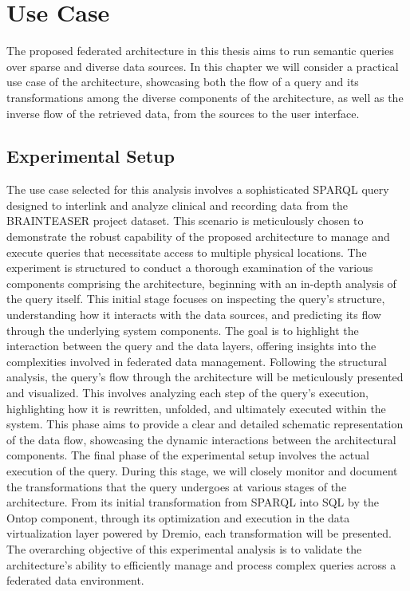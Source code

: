 
\chapter{Use Case}
\label{chp:usecase}

The proposed federated architecture in this thesis aims to run semantic queries over sparse and diverse data sources. In this chapter we will consider a practical use case of the architecture, showcasing both the flow of a query and its transformations among the diverse components of the architecture, as well as the inverse flow of the retrieved data, from the sources to the user interface.

\section{Experimental Setup}
The use case selected for this analysis involves a sophisticated \ac{SPARQL} query designed to interlink and analyze clinical and recording data from the BRAINTEASER project dataset. This scenario is meticulously chosen to demonstrate the robust capability of the proposed architecture to manage and execute queries that necessitate access to multiple physical locations.
The experiment is structured to conduct a thorough examination of the various components comprising the architecture, beginning with an in-depth analysis of the query itself. This initial stage focuses on inspecting the query's structure, understanding how it interacts with the data sources, and predicting its flow through the underlying system components. The goal is to highlight the interaction between the query and the data layers, offering insights into the complexities involved in federated data management.
Following the structural analysis, the query's flow through the architecture will be meticulously presented and visualized. This involves analyzing each step of the query's execution, highlighting how it is rewritten, unfolded, and ultimately executed within the system. This phase aims to provide a clear and detailed schematic representation of the data flow, showcasing the dynamic interactions between the architectural components.
The final phase of the experimental setup involves the actual execution of the query. During this stage, we will closely monitor and document the transformations that the query undergoes at various stages of the architecture. From its initial transformation from SPARQL into SQL by the Ontop component, through its optimization and execution in the data virtualization layer powered by Dremio, each transformation will be presented.
The overarching objective of this experimental analysis is to validate the architecture's ability to efficiently manage and process complex queries across a federated data environment.

